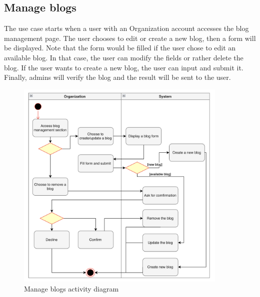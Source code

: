 \subsection{Manage blogs}
The use case starts when a user with an Organization account accesses the blog management page. The user chooses to edit or create a new blog, then a form will be displayed. Note that the form would be filled if the user chose to edit an available blog. In that case, the user can modify the fields or rather delete the blog. If the user wants to create a new blog, the user can input and submit it. Finally, admins will verify the blog and the result will be sent to the user.
\begin {figure}[H]
\centering
\includegraphics[width=0.9\textwidth]{Figures/manage_blog_org.png}
\caption{Manage blogs activity diagram}
\label{fig:manage-blog}
\end{figure}
\newpage

